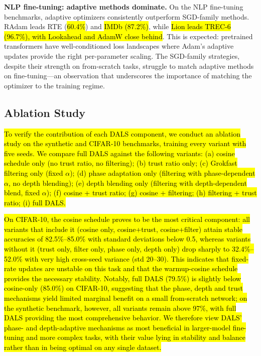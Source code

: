 \documentclass[a4paper,fleqn]{cas-dc}
\begin{document}
\textbf{NLP fine-tuning: adaptive methods dominate.} On the NLP fine-tuning benchmarks, adaptive optimizers consistently outperform SGD-family methods. RAdam leads RTE (\hl{60.4\%}) and \hl{IMDb (87.2\%)}, while \hl{Lion leads TREC-6 (96.7\%), with Lookahead and AdamW close behind}. This is expected: pretrained transformers have well-conditioned loss landscapes where Adam's adaptive updates provide the right per-parameter scaling. The SGD-family strategies, despite their strength on from-scratch tasks, struggle to match adaptive methods on fine-tuning---an observation that underscores the importance of matching the optimizer to the training regime.

\subsection{Ablation Study}\label{sec:ablation}

\hl{To verify the contribution of each DALS component, we conduct an ablation study on the synthetic and CIFAR-10 benchmarks, training every variant with five seeds. We compare full DALS against the following variants: (a) cosine schedule only (no trust ratio, no filtering); (b) trust ratio only; (c) Grokfast filtering only (fixed $\alpha$); (d) phase adaptation only (filtering with phase-dependent $\alpha$, no depth blending); (e) depth blending only (filtering with depth-dependent blend, fixed $\alpha$); (f) cosine + trust ratio; (g) cosine + filtering; (h) filtering + trust ratio; (i) full DALS.}

\hl{On CIFAR-10, the cosine schedule proves to be the most critical component: all variants that include it (cosine only, cosine+trust, cosine+filter) attain stable accuracies of 82.5\%--85.0\% with standard deviations below 0.5, whereas variants without it (trust only, filter only, phase only, depth only) drop sharply to 32.4\%--52.0\% with very high cross-seed variance (std 20--30). This indicates that fixed-rate updates are unstable on this task and that the warmup-cosine schedule provides the necessary stability. Notably, full DALS (79.5\%) is slightly below cosine-only (85.0\%) on CIFAR-10, suggesting that the phase, depth and trust mechanisms yield limited marginal benefit on a small from-scratch network; on the synthetic benchmark, however, all variants remain above 97\%, with full DALS providing the most comprehensive behavior. We therefore view DALS' phase- and depth-adaptive mechanisms as most beneficial in larger-model fine-tuning and more complex tasks, with their value lying in stability and balance rather than in being optimal on any single dataset.}
\end{document}
